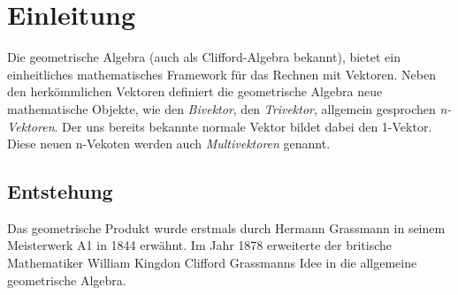 %
%
%
%
\section{Einleitung\label{geoalgebra:section:einfuehrung}}
Die geometrische Algebra (auch als Clifford-Algebra bekannt), bietet ein einheitliches mathematisches
Framework für das Rechnen mit Vektoren.
Neben den herkömmlichen Vektoren definiert die geometrische
Algebra neue mathematische Objekte, wie den \emph{Bivektor}, den \emph{Trivektor}, allgemein gesprochen
\emph{n-Vektoren}.
Der uns bereits bekannte normale Vektor bildet dabei den 1-Vektor. Diese neuen n-Vekoten werden auch
\emph{Multivektoren} genannt.

\subsection{Entstehung}
Das geometrische Produkt wurde erstmals durch Hermann Grassmann in seinem Meisterwerk \glqq{}A1\grqq{} in 1844
erwähnt. Im Jahr 1878 erweiterte der britische Mathematiker William Kingdon Clifford Grassmanns Idee
in die allgemeine geometrische Algebra. 

